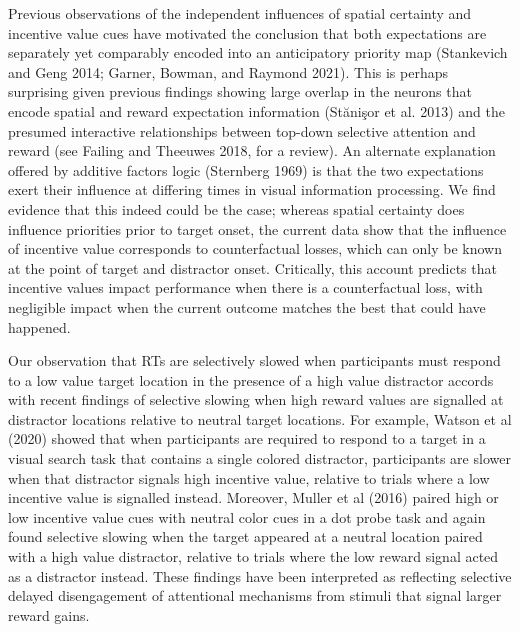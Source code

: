 \documentclass[11pt,halfline,a4paper,]{ouparticle}
\begin{document}
Previous observations of the independent influences of spatial certainty and incentive value cues have motivated the conclusion that both expectations are separately yet comparably encoded into an anticipatory priority map (Stankevich and Geng 2014; Garner, Bowman, and Raymond 2021). This is perhaps surprising given previous findings showing large overlap in the neurons that encode spatial and reward expectation information (Stănişor et al. 2013) and the presumed interactive relationships between top-down selective attention and reward (see Failing and Theeuwes 2018, for a review). An alternate explanation offered by additive factors logic (Sternberg 1969) is that the two expectations exert their influence at differing times in visual information processing. We find evidence that this indeed could be the case; whereas spatial certainty does influence priorities prior to target onset, the current data show that the influence of incentive value corresponds to counterfactual losses, which can only be known at the point of target and distractor onset. Critically, this account predicts that incentive values impact performance when there is a counterfactual loss, with negligible impact when the current outcome matches the best that could have happened.

Our observation that RTs are selectively slowed when participants must respond to a low value target location in the presence of a high value distractor accords with recent findings of selective slowing when high reward values are signalled at distractor locations relative to neutral target locations. For example, Watson et al (2020) showed that when participants are required to respond to a target in a visual search task that contains a single colored distractor, participants are slower when that distractor signals high incentive value, relative to trials where a low incentive value is signalled instead. Moreover, Muller et al (2016) paired high or low incentive value cues with neutral color cues in a dot probe task and again found selective slowing when the target appeared at a neutral location paired with a high value distractor, relative to trials where the low reward signal acted as a distractor instead. These findings have been interpreted as reflecting selective delayed disengagement of attentional mechanisms from stimuli that signal larger reward gains.
\end{document}
